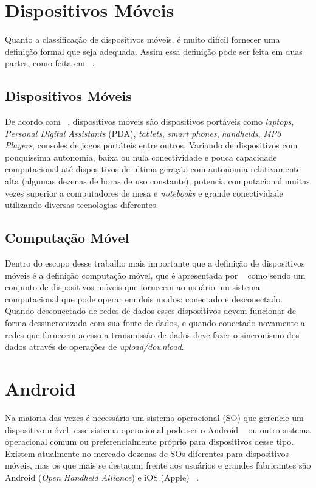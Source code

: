\section{Dispositivos Móveis}

    Quanto a classificação de dispositivos móveis, é muito difícil fornecer uma definição formal que seja adequada. Assim essa definição pode ser feita em duas partes, como feita em ~\cite{mobileDevices}.
    
    \subsection{Dispositivos Móveis}
    De acordo com ~\cite{mobileDevices}, dispositivos móveis são dispositivos portáveis como    \textit{laptops}, \textit{Personal Digital Assistants} (PDA), \textit{tablets}, \textit{smart phones}, \textit{handhelds}, \textit{MP3 Players}, consoles de jogos portáteis entre outros. Variando de dispositivos com pouquíssima autonomia, baixa ou nula conectividade e pouca capacidade computacional até dispositivos de ultima geração com autonomia relativamente alta (algumas dezenas de horas de uso constante), potencia computacional muitas vezes superior a computadores de mesa e \textit{notebooks} e grande conectividade utilizando diversas tecnologias diferentes. 
    
    
    \subsection{Computação Móvel}
    Dentro do escopo desse trabalho mais importante que a definição de dispositivos móveis é a definição  computação móvel, que é apresentada por ~\cite{mobileDevices} como sendo um conjunto de dispositivos móveis que fornecem ao usuário um sistema computacional que pode operar em dois modos: conectado e desconectado. Quando desconectado de redes de dados esses dispositivos devem funcionar de forma dessincronizada com sua fonte de dados, e quando conectado novamente a redes que fornecem acesso a transmissão de dados deve fazer o sincronismo dos dados através de operações de \textit{upload/download}.
    
    
\section{Android}

Na maioria das vezes é necessário um sistema operacional (SO) que gerencie um dispositivo móvel, esse sistema operacional pode ser o Android ~\cite{android} ou outro sistema operacional comum ou preferencialmente próprio para dispositivos desse tipo. Existem atualmente no mercado dezenas de SOs diferentes para dispositivos móveis, mas os que mais se destacam frente aos usuários e grandes fabricantes são Android (\textit{Open Handheld Alliance}) e iOS (Apple) ~\cite{mobileDevicesMarketShare}.

